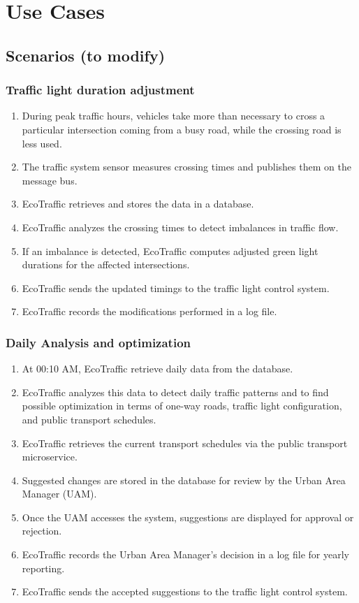 \documentclass[12pt, a4paper, twoside, openright]{report}
\begin{document}
\section{Use Cases}\label{sec:use-cases}
\subsection{Scenarios (to modify)}\label{subsec:scenarios}

\subsubsection{Traffic light duration adjustment}\label{subsubsec:traffic-light-duration}

\begin{enumerate}
\item
  During peak traffic hours, vehicles take more than necessary to cross a
  particular intersection coming from a busy road, while the crossing
  road is less used.
\item
  The traffic system sensor measures crossing times and publishes them on the
  message bus.
\item
  EcoTraffic retrieves and stores the data in a database.
\item
  EcoTraffic analyzes the crossing times to detect imbalances in traffic flow.
\item
  If an imbalance is detected, EcoTraffic computes adjusted green light durations for the affected intersections.
\item
  EcoTraffic sends the updated timings to the traffic light control system.
\item
  EcoTraffic records the modifications performed in a log file.
\end{enumerate}

\subsubsection{Daily Analysis and optimization}\label{subsubsec:daily-analysis}

\begin{enumerate}
\item
  At 00:10 AM, EcoTraffic retrieve daily data from the
  database.
\item
  EcoTraffic analyzes this data to detect daily traffic patterns and to
  find possible optimization in terms of one-way roads, traffic light
  configuration, and public transport schedules.
\item
  EcoTraffic retrieves the current transport schedules via the public transport microservice.
\item
  Suggested changes are stored in the database for review by the Urban Area Manager (UAM).
\item
  Once the UAM accesses the system, suggestions are displayed for approval or rejection.
\item
  EcoTraffic records the Urban Area Manager's decision in a log file for yearly reporting.
\item
  EcoTraffic sends the accepted suggestions to the traffic light control system.
\end{enumerate}
\end{document}
